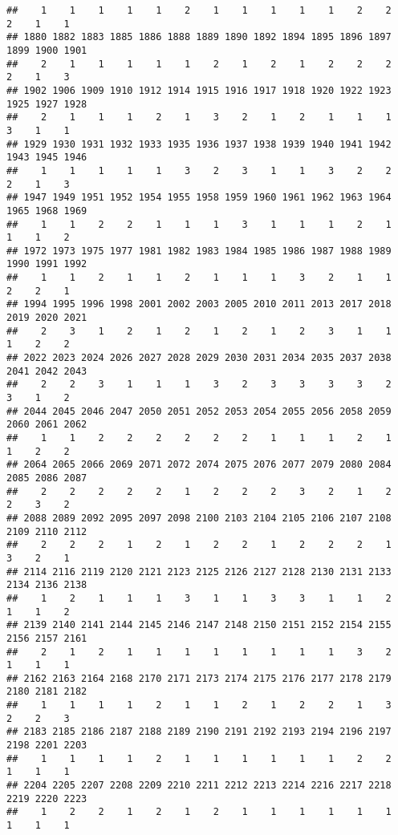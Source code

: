 \documentclass[
]{article}
\begin{document}
\begin{verbatim}
##    1    1    1    1    1    2    1    1    1    1    1    2    2    2    1    1 
## 1880 1882 1883 1885 1886 1888 1889 1890 1892 1894 1895 1896 1897 1899 1900 1901 
##    2    1    1    1    1    1    2    1    2    1    2    2    2    2    1    3 
## 1902 1906 1909 1910 1912 1914 1915 1916 1917 1918 1920 1922 1923 1925 1927 1928 
##    2    1    1    1    2    1    3    2    1    2    1    1    1    3    1    1 
## 1929 1930 1931 1932 1933 1935 1936 1937 1938 1939 1940 1941 1942 1943 1945 1946 
##    1    1    1    1    1    3    2    3    1    1    3    2    2    2    1    3 
## 1947 1949 1951 1952 1954 1955 1958 1959 1960 1961 1962 1963 1964 1965 1968 1969 
##    1    1    2    2    1    1    1    3    1    1    1    2    1    1    1    2 
## 1972 1973 1975 1977 1981 1982 1983 1984 1985 1986 1987 1988 1989 1990 1991 1992 
##    1    1    2    1    1    2    1    1    1    3    2    1    1    2    2    1 
## 1994 1995 1996 1998 2001 2002 2003 2005 2010 2011 2013 2017 2018 2019 2020 2021 
##    2    3    1    2    1    2    1    2    1    2    3    1    1    1    2    2 
## 2022 2023 2024 2026 2027 2028 2029 2030 2031 2034 2035 2037 2038 2041 2042 2043 
##    2    2    3    1    1    1    3    2    3    3    3    3    2    3    1    2 
## 2044 2045 2046 2047 2050 2051 2052 2053 2054 2055 2056 2058 2059 2060 2061 2062 
##    1    1    2    2    2    2    2    2    1    1    1    2    1    1    2    2 
## 2064 2065 2066 2069 2071 2072 2074 2075 2076 2077 2079 2080 2084 2085 2086 2087 
##    2    2    2    2    2    1    2    2    2    3    2    1    2    2    3    2 
## 2088 2089 2092 2095 2097 2098 2100 2103 2104 2105 2106 2107 2108 2109 2110 2112 
##    2    2    2    1    2    1    2    2    1    2    2    2    1    3    2    1 
## 2114 2116 2119 2120 2121 2123 2125 2126 2127 2128 2130 2131 2133 2134 2136 2138 
##    1    2    1    1    1    3    1    1    3    3    1    1    2    1    1    2 
## 2139 2140 2141 2144 2145 2146 2147 2148 2150 2151 2152 2154 2155 2156 2157 2161 
##    2    1    2    1    1    1    1    1    1    1    1    3    2    1    1    1 
## 2162 2163 2164 2168 2170 2171 2173 2174 2175 2176 2177 2178 2179 2180 2181 2182 
##    1    1    1    1    2    1    1    2    1    2    2    1    3    2    2    3 
## 2183 2185 2186 2187 2188 2189 2190 2191 2192 2193 2194 2196 2197 2198 2201 2203 
##    1    1    1    1    2    1    1    1    1    1    1    2    2    1    1    1 
## 2204 2205 2207 2208 2209 2210 2211 2212 2213 2214 2216 2217 2218 2219 2220 2223 
##    1    2    2    1    2    1    2    1    1    1    1    1    1    1    1    1 

\end{verbatim}
\end{document}
